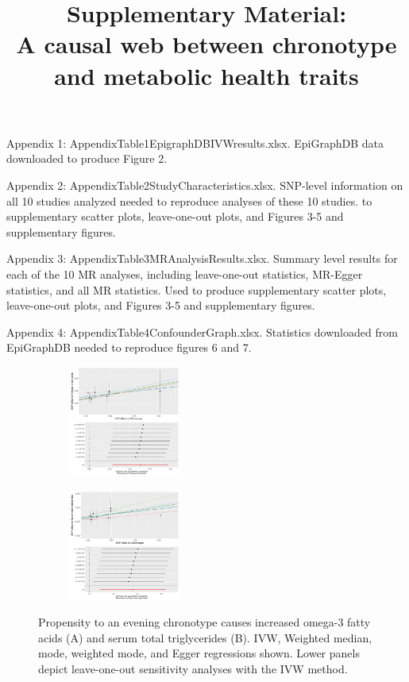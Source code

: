 \documentclass{article}
\title{{\bf Supplementary Material:} \\A causal web between chronotype and metabolic health traits}
\author{}
\date{}
\begin{document}
\maketitle

Appendix 1: AppendixTable1EpigraphDBIVWresults.xlsx. EpiGraphDB data downloaded to produce Figure 2.

Appendix 2: AppendixTable2StudyCharacteristics.xlsx.
SNP-level information on all 10 studies analyzed needed to reproduce analyses of these 10 studies. to supplementary scatter plots, leave-one-out plots, and Figures 3-5 and supplementary figures.

Appendix 3: AppendixTable3MRAnalysisResults.xlsx. Summary level results for each of the 10 MR analyses, including leave-one-out statistics, MR-Egger statistics, and all MR statistics. Used to produce supplementary scatter plots, leave-one-out plots, and Figures 3-5 and supplementary figures. 

Appendix 4: AppendixTable4ConfounderGraph.xlsx.
Statistics downloaded from EpiGraphDB needed to reproduce figures 6 and 7.




\begin{figure}[htbp]
     \centering
     \begin{subfigure}[b]{0.4\textwidth}
         \centering
         \includegraphics[width=0.4\textwidth]{Figs/Analysis2/Chronotype_vs_Omega-3_fatty_acids.Plots.pdf}
         \label{omega3}
     \end{subfigure}
     \begin{subfigure}[b]{0.4\textwidth}
         \centering
         \includegraphics[width=0.4\textwidth]{Figs/Analysis2/Chronotype_vs_Serum_total_triglycerides.Plots.pdf}
         \label{totalTG}
     \end{subfigure}
        \caption{Propensity to an evening chronotype causes increased omega-3 fatty acids (A) and serum total triglycerides (B). IVW, Weighted median, mode, weighted mode, and Egger regressions shown. Lower panels depict leave-one-out sensitivity analyses with the IVW method.}
        \label{omega3tgs}
\end{figure}
\end{document}
